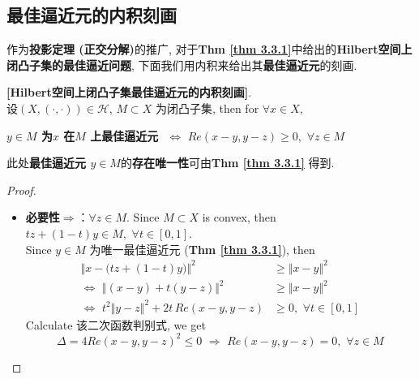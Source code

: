 \newpage

\subsection{最佳逼近元的内积刻画}
	作为\textbf{投影定理 (正交分解)}的推广, 对于\textbf{Thm \ref{thm 3.3.1}}中给出的\textbf{Hilbert空间上闭凸子集的最佳逼近问题}, 下面我们用内积来给出其\textbf{最佳逼近元}的刻画. 
	
	\vspace{1em}
	
	\begin{thm}\label{thm 3.3.3}
		\textbf{[Hilbert空间上闭凸子集最佳逼近元的内积刻画]}. \\
		设$(X , (\cdot , \cdot)) \in \mathcal{H}$, $M \subset X$ 为闭凸子集, then for $\forall x \in X$, 
		\begin{center}
			\textbf{$y \in M$ 为$x$ 在$M$ 上最佳逼近元 $\,\, \Leftrightarrow \,\, Re (x - y , y - z) \geq 0 , \,\, \forall z \in M$}
		\end{center}
	
		\vspace{2em}
		
		\begin{rmk}
			此处\textbf{最佳逼近元 $y \in M$}的\textbf{存在唯一性}可由\textbf{Thm \ref{thm 3.3.1}} 得到. 
		\end{rmk}
		
		\vspace{4em}
		
		\begin{proof}
			\begin{itemize}
				\item \textbf{必要性$\Rightarrow$}：$\forall z \in M$. Since $M \subset X$ is convex, then $tz + (1 - t)y \in M , \,\, \forall t \in [0 , 1]$.  \\
				Since $y \in M$ 为唯一最佳逼近元 (\textbf{Thm \ref{thm 3.3.1}}), then
				\begin{align}
					\Big\Vert x - \Big( tz + (1 - t)y \Big) \Big\Vert^2 
					&\geq \Vert x - y \Vert^2 \\
					\Leftrightarrow \,\, \Big\Vert (x - y) + t(y - z) \Big\Vert^2 
					&\geq \Vert x - y \Vert^2 \\
					\Leftrightarrow \,\, t^2 \Vert y - z \Vert^2 + 2t \, Re(x - y , y - z) 
					&\geq 0 , \,\, \forall t \in [0 , 1]
				\end{align}
				Calculate 该二次函数判别式, we get
				\[ \Delta = 4 Re(x - y , y - z)^2 \leq 0 \,\, \Rightarrow \,\, Re(x - y , y - z) = 0 , \,\, \forall z \in M \]
				

\end{itemize}
\end{proof}
\end{thm}
